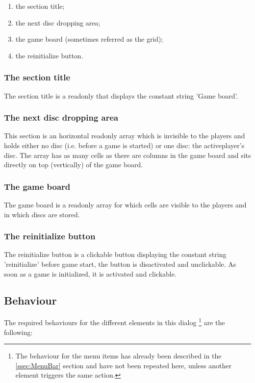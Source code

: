   \begin{enumerate}
    \item the section title;
    \item the next disc dropping area;
    \item the game board (sometimes referred as the grid);
    \item the reinitialize button.
  \end{enumerate}


    \subsubsection{The section title}
	The section title is a readonly  that displays the constant string
    'Game board'.


    \subsubsection{The next disc dropping area}
	This section is an horizontal readonly array which is invisible to the
    players and holds either no disc (i.e. before a game is started) or one
    disc: the activeplayer's disc. The array has as many cells as there are
	columns in the game board and sits directly on top (vertically) of the game
    board.


    \subsubsection{The game board}
	The game board is a readonly array for which cells are visible to the players
    and in which discs are stored.


    \subsubsection{The reinitialize button}
	The reinitialize button is a clickable button displaying the constant string
    'reinitialize' before game start, the button is disactivated and unclickable.
    As soon as a game is initialized, it is activated and clickable.


  \subsection{Behaviour} \label{ssec:GameBoardDlgBehaviour}
  The required behaviours for the different elements in this dialog \footnote{The
  behaviour for the menu items has already been described in the
  \cref{ssec:MenuBar} section and have not been repeated here, unless another
  element triggers the same action.} are the following:

